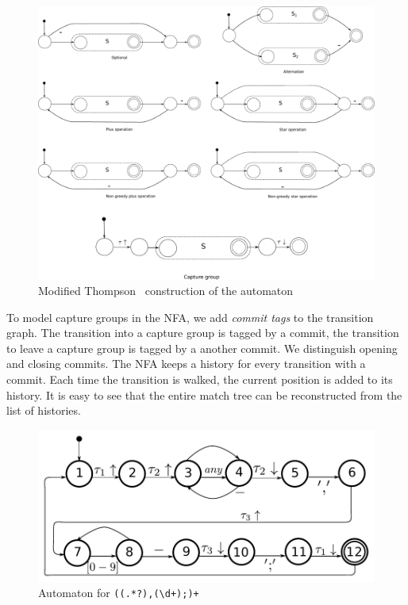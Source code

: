 \documentclass[english]{sigplanconf}
\theoremstyle{definition}
\begin{document}
\begin{figure}[tb]
\includegraphics[width=\linewidth]{graphs/thompson}
\caption{Modified Thompson~\cite{ThompsonRegex} construction of the automaton}
\label{fig:thompson-construction}
\end{figure}

To model capture groups in the NFA, we add \emph{commit tags} to the
transition graph. The transition into a capture group is tagged by a
commit, the transition to leave a capture group is tagged by a another
commit. We distinguish opening and closing commits. The NFA keeps a
history for every transition with a commit. Each time the transition
is walked, the current position is added to its history. It is easy to
see that the entire match tree can be reconstructed from the list of
histories.

\begin{figure}
\includegraphics[width=\linewidth]{graphs/lehrer_automaton}

\caption{\label{fig:example-automaton}
Automaton for \texttt{((.*?),(\textbackslash{}d+);)+} }
\end{figure}
\end{document}
